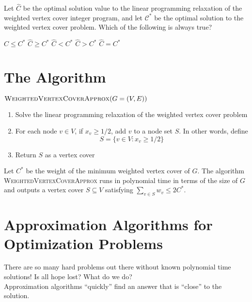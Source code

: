 \documentclass[11  pt]{article}
\begin{document}
\vfill

\begin{Qu}
	Let $\hat{C}$ be the optimal solution value to the linear programming relaxation of the weighted vertex cover integer program, and let $\mathcal{C}^*$ be the optimal solution to the weighted vertex cover problem. Which of the following is always true?
	\begin{itemize}
		\aitem $\hat{C} \leq C^*$
		\bitem $\hat{C} \geq C^*$
		\citem $\hat{C} < C^*$
		\ditem $\hat{C} > C^*$
		\eitem $\hat{C} = C^*$
	\end{itemize}
\end{Qu}

\newpage
\section{The Algorithm}
	$\textsc{WeightedVertexCoverApprox}(G = (V,E))$
\begin{enumerate}
	\item Solve the linear programming relaxation of the weighted vertex cover problem
	\item For each node $v \in V$, if $x_v \geq 1/2$, add $v$ to a node set $S$. In other words, define
	\begin{equation*}
		S = \{v \in V \colon x_v \geq 1/2\}
	\end{equation*}
	\item Return $S$ as a vertex cover
\end{enumerate}
\begin{theorem}
	Let $C^*$ be the weight of the minimum weighted vertex cover of $G$. The algorithm \textsc{WeightedVertexCoverApprox} runs in polynomial time in terms of the size of $G$ and outputs a vertex cover $S \subseteq V$ satisfying $\sum_{v \in S} w_v\leq 2C^*$. 
\end{theorem}
	
	
	
	
	
	
	
	
	
	\section{Approximation Algorithms for Optimization Problems}
	There are so many hard problems out there without known polynomial time solutions! Is all hope lost? What do we do?\\
	
	Approximation algorithms ``quickly'' find an answer that is ``close'' to the solution. \\ \\
	
\end{document}
